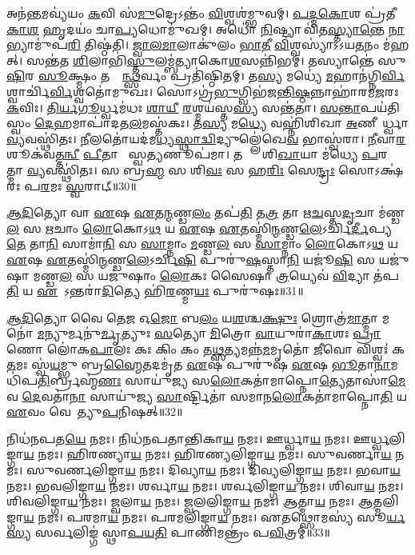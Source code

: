 𑌅𑌨॑\ul{𑌨𑍍𑌤}𑌮𑌵𑍍𑌯॑𑌯𑌂 \ul{𑌕}𑌵𑌿 𑌸॑\ul{𑌮𑍁}𑌦𑍍𑌰𑍇𑌽𑌨𑍍𑌤𑌂॑ \ul{𑌵𑌿}𑌶𑍍𑌵𑌶॑𑌮𑍍𑌭𑍁𑌵𑌮𑍍। 
\ul{𑌪}\ul{𑌦𑍍𑌮}\ul{𑌕𑍋}𑌶 𑌪𑍍𑌰॑𑌤𑍀\ul{𑌕𑌾}\ul{𑌶}\ul{} \ul{𑌹𑍃}𑌦𑌯𑌂॑ 𑌚𑌾\ul{𑌪𑍍𑌯}𑌧𑍋𑌮𑍁॑𑌖𑌮𑍍। 
𑌅𑌧𑍋॑ \ul{𑌨𑌿}𑌷𑍍𑌟𑍍𑌯𑌾 𑌵𑌿॑𑌤\ul{𑌸𑍍𑌤𑍍𑌯𑌾}\ul{𑌨𑍍𑌤𑍇} \ul{𑌨𑌾}𑌭𑍍𑌯𑌾𑌮𑍁॑𑌪\ul{𑌰𑌿} 𑌤𑌿𑌷𑍍𑌠॑𑌤𑌿। 
\ul{𑌜𑍍𑌵𑌾}\ul{𑌲}\ul{𑌮𑌾}𑌲𑌾𑌕𑍁॑𑌲𑌂 \ul{𑌭𑌾}\ul{𑌤𑍀} \ul{𑌵𑌿}𑌶𑍍𑌵𑌸𑍍𑌯𑌾॑𑌽𑌽𑌯\ul{𑌤}𑌨𑌂 𑌮॑𑌹𑌤𑍍। 
𑌸𑌨𑍍𑌤॑𑌤 \ul{𑌶𑌿}𑌲𑌾𑌭𑌿॑\ul{𑌸𑍍𑌤𑍁}\-𑌲𑌮𑍍𑌬॑𑌤𑍍𑌯𑌾𑌕𑍋\ul{𑌶}𑌸𑌨𑍍𑌨𑌿॑𑌭𑌮𑍍। 
𑌤𑌸𑍍𑌯𑌾𑌨𑍍𑌤𑍇॑ 𑌸𑍁\ul{𑌷𑌿}𑌰 \ul{𑌸𑍂}𑌕𑍍𑌷𑍍𑌮𑌂 𑌤𑌸𑍍𑌮𑌿᳚\ul{𑌨𑍍𑌥𑍍𑌸}𑌰𑍍𑌵𑌂 𑌪𑍍𑌰𑌤𑌿॑𑌷𑍍𑌠𑌿𑌤𑌮𑍍। 
𑌤\ul{𑌸𑍍𑌯} 𑌮𑌧𑍍𑌯𑍇॑ \ul{𑌮}𑌹𑌾𑌨॑\-𑌗𑍍𑌨𑌿\ul{𑌰𑍍𑌵𑌿}𑌶𑍍𑌵𑌾𑌰𑍍𑌚𑌿॑\ul{𑌰𑍍𑌵𑌿}𑌶𑍍𑌵𑌤𑍋॑𑌮𑍁𑌖𑌃। 
𑌸𑍋𑌽𑌗𑍍𑌰॑\ul{𑌭𑍁}𑌗𑍍𑌵𑌿𑌭॑𑌜\ul{𑌨𑍍𑌤𑌿}\ul{𑌷𑍍𑌠}𑌨𑍍𑌨𑌾𑌹𑌾॑𑌰𑌮\ul{𑌜}𑌰𑌃 \ul{𑌕}𑌵𑌿𑌃। 
\ul{𑌤𑌿}\ul{𑌰𑍍𑌯}\ul{𑌗𑍂}𑌰𑍍𑌧𑍍𑌵𑌮॑𑌧𑌃 \ul{𑌶𑌾}\ul{𑌯𑍀} \ul{𑌰}𑌶𑍍𑌮𑌯॑𑌸𑍍𑌤\ul{𑌸𑍍𑌯} 𑌸𑌨𑍍𑌤॑𑌤𑌾। 
\ul{𑌸}\ul{𑌨𑍍𑌤𑌾}𑌪𑌯॑𑌤𑌿 𑌸𑍍𑌵𑌂 \ul{𑌦𑍇}𑌹𑌮𑌾𑌪𑌾॑𑌦\-𑌤\ul{𑌲}\-𑌮𑌸𑍍𑌤॑𑌕𑌃। 
𑌤\ul{𑌸𑍍𑌯} 𑌮\ul{𑌧𑍍𑌯𑍇} 𑌵𑌹𑍍𑌨𑌿॑𑌶𑌿𑌖𑌾 \ul{𑌅}𑌣𑍀𑌯𑍋᳚𑌰𑍍𑌧𑍍𑌵𑌾 \ul{𑌵𑍍𑌯}𑌵𑌸𑍍𑌥𑌿॑𑌤𑌃। 
\ul{𑌨𑍀}𑌲𑌤𑍋॑𑌯𑌦॑\-𑌮\ul{𑌧𑍍𑌯}\ul{𑌸𑍍𑌥𑌾}\ul{𑌦𑍍𑌵𑌿}𑌦𑍍𑌯𑍁𑌲𑍍𑌲𑍇॑𑌖𑍇\ul{𑌵} 𑌭𑌾𑌸𑍍𑌵॑𑌰𑌾। 
\ul{𑌨𑍀}𑌵𑌾\ul{𑌰}𑌶𑍂𑌕॑𑌵\ul{𑌤𑍍𑌤}\ul{𑌨𑍍𑌵𑍀} \ul{𑌪𑍀}𑌤𑌾 𑌭𑌾᳚𑌸𑍍𑌵\ul{𑌤𑍍𑌯}𑌣𑍂𑌪॑𑌮𑌾। 
𑌤𑌸𑍍𑌯𑌾𑌃᳚ 𑌶𑌿\ul{𑌖𑌾}𑌯𑌾 𑌮॑𑌧𑍍𑌯𑍇 \ul{𑌪}𑌰𑌮𑌾᳚𑌤𑍍𑌮𑌾 \ul{𑌵𑍍𑌯}𑌵𑌸𑍍𑌥𑌿॑𑌤𑌃। 
𑌸 𑌬𑍍𑌰\ul{𑌹𑍍𑌮} 𑌸 𑌶𑌿\ul{𑌵𑌃} 𑌸 𑌹\ul{𑌰𑌿𑌃} 𑌸𑍇\ul{𑌨𑍍𑌦𑍍𑌰𑌃} 𑌸𑍋𑌽𑌕𑍍𑌷॑𑌰𑌃 𑌪\ul{𑌰}𑌮𑌃 \ul{𑌸𑍍𑌵}𑌰𑌾𑌟𑍍॥30॥
\anuvakamend[\ul{𑌨𑌾}\ul{𑌰𑌾}\ul{𑌯}𑌣𑌃 𑌸𑍍𑌥𑌿॑𑌤𑍋 \ul{𑌵𑍍𑌯}𑌵𑌸𑍍𑌥𑌿॑𑌤\ul{𑌶𑍍𑌚}𑌤𑍍𑌵𑌾𑌰𑌿॑ 𑌚]

\ul{𑌆}\ul{𑌦𑌿}𑌤𑍍𑌯𑍋 𑌵𑌾 \ul{𑌏}𑌷 \ul{𑌏}𑌤\ul{𑌨𑍍𑌮}𑌣𑍍𑌡\ul{𑌲𑌂} 𑌤𑌪॑\ul{𑌤𑌿} 𑌤\ul{𑌤𑍍𑌰} 𑌤𑌾 𑌋\ul{𑌚}𑌸𑍍𑌤\ul{𑌦𑍃}𑌚𑌾 𑌮॑𑌣𑍍𑌡\ul{𑌲}\ul{} 𑌸 \ul{𑌋}𑌚𑌾𑌂 \ul{𑌲𑍋}𑌕𑍋𑌽\ul{𑌥} 𑌯 \ul{𑌏}𑌷 \ul{𑌏}𑌤𑌸𑍍𑌮𑌿॑\ul{𑌨𑍍𑌮}𑌣𑍍𑌡\ul{𑌲𑍇}𑌽𑌰𑍍𑌚𑌿\ul{𑌰𑍍𑌦𑍀}𑌪𑍍𑌯\ul{𑌤𑍇} 𑌤𑌾\ul{𑌨𑌿} 𑌸𑌾𑌮𑌾॑\ul{𑌨𑌿} 𑌸 \ul{𑌸𑌾}𑌮𑍍𑌨𑌾𑌂 \ul{𑌮}𑌣𑍍𑌡\ul{𑌲}\ul{} 𑌸 \ul{𑌸𑌾}𑌮𑍍𑌨𑌾𑌂 \ul{𑌲𑍋}𑌕𑍋𑌽\ul{𑌥} 𑌯 \ul{𑌏}𑌷 \ul{𑌏}𑌤𑌸𑍍𑌮𑌿॑\ul{𑌨𑍍𑌮}𑌣𑍍𑌡\ul{𑌲𑍇}𑌽𑌰𑍍𑌚𑌿\ul{𑌷𑌿} 𑌪𑍁𑌰𑍁॑\ul{𑌷}𑌸𑍍𑌤𑌾\ul{𑌨𑌿} 𑌯𑌜𑍂॑\ul{𑌷𑌿} 𑌸 𑌯𑌜𑍁॑𑌷𑌾 𑌮𑌣𑍍𑌡\ul{𑌲}\ul{} 𑌸 𑌯𑌜𑍁॑𑌷𑌾𑌂 \ul{𑌲𑍋}𑌕𑌃 𑌸𑍈𑌷𑌾 \ul{𑌤𑍍𑌰}𑌯𑍍𑌯𑍇𑌵॑ \ul{𑌵𑌿}𑌦𑍍𑌯𑌾 𑌤॑𑌪\ul{𑌤𑌿} 𑌯 \ul{𑌏}𑌷𑍋᳚𑌽𑌨𑍍𑌤𑌰𑌾॑\ul{𑌦𑌿}𑌤𑍍𑌯𑍇 𑌹𑌿॑\ul{𑌰}𑌣𑍍𑌮\ul{𑌯𑌃} 𑌪𑍁𑌰𑍁॑𑌷𑌃॥31॥
\anuvakamend


\ul{𑌆}\ul{𑌦𑌿}𑌤𑍍𑌯𑍋 𑌵𑍈 𑌤𑍇\ul{𑌜} 𑌓\ul{𑌜𑍋} 𑌬\ul{𑌲𑌂} 𑌯\ul{𑌶}𑌶𑍍𑌚\ul{𑌕𑍍𑌷𑍁𑌃} 𑌶𑍍𑌰𑍋𑌤𑍍𑌰॑\ul{𑌮𑌾}𑌤𑍍𑌮𑌾 𑌮𑌨𑍋॑ \ul{𑌮}𑌨𑍍𑌯𑍁𑌰𑍍𑌮𑌨𑍁॑\ul{𑌰𑍍𑌮𑍃}𑌤𑍍𑌯𑍁𑌃 \ul{𑌸}𑌤𑍍𑌯𑍋 \ul{𑌮𑌿}𑌤𑍍𑌰𑍋 \ul{𑌵𑌾}𑌯𑍁𑌰𑌾॑\ul{𑌕𑌾}𑌶𑌃 \ul{𑌪𑍍𑌰𑌾}𑌣𑍋 𑌲𑍋॑𑌕\ul{𑌪𑌾}𑌲𑌃 𑌕𑌃 𑌕𑌿𑌂 𑌕𑌂 𑌤\ul{𑌥𑍍𑌸}𑌤𑍍𑌯𑌮𑌨𑍍𑌨॑\ul{𑌮}𑌮𑍃𑌤𑍋॑ \ul{𑌜𑍀}𑌵𑍋 𑌵𑌿𑌶𑍍𑌵𑌃॑ 𑌕\ul{𑌤}𑌮𑌃 𑌸𑍍𑌵॑\ul{𑌯}𑌮𑍍𑌭𑍁 𑌬𑍍𑌰\ul{𑌹𑍍𑌮𑍈}𑌤𑌦𑌮𑍃॑𑌤 \ul{𑌏}𑌷 𑌪𑍁𑌰𑍁॑𑌷 \ul{𑌏}𑌷 \ul{𑌭𑍂}𑌤𑌾\ul{𑌨𑌾}𑌮𑌧𑌿॑𑌪\ul{𑌤𑌿}𑌰𑍍𑌬𑍍𑌰𑌹𑍍𑌮॑\ul{𑌣𑌃} 𑌸𑌾𑌯𑍁॑𑌜𑍍𑌯 𑌸\ul{𑌲𑍋}𑌕𑌤𑌾॑𑌮𑌾𑌪𑍍𑌨𑍋\ul{𑌤𑍍𑌯𑍇}𑌤𑌾𑌸𑌾॑\ul{𑌮𑍇}𑌵 \ul{𑌦𑍇}𑌵𑌤𑌾॑\ul{𑌨𑌾}\ul{} 𑌸𑌾𑌯𑍁॑𑌜𑍍𑌯 \ul{𑌸𑌾}𑌰𑍍𑌷𑍍𑌟𑌿𑌤𑌾॑ 𑌸𑌮𑌾𑌨\ul{𑌲𑍋}𑌕𑌤𑌾॑𑌮𑌾𑌪𑍍𑌨𑍋\ul{𑌤𑌿} 𑌯 \ul{𑌏}𑌵𑌂 𑌵𑍇𑌦𑍇᳚𑌤𑍍𑌯𑍁\ul{𑌪}𑌨𑌿𑌷𑌤𑍍॥32॥
\anuvakamend

𑌨𑌿𑌧॑𑌨𑌪𑌤\ul{𑌯𑍇} 𑌨𑌮𑌃। 
𑌨𑌿𑌧॑𑌨𑌪𑌤𑌾𑌨𑍍𑌤𑌿𑌕𑌾\ul{𑌯} 𑌨𑌮𑌃। 
𑌊𑌰𑍍𑌧𑍍𑌵𑌾\ul{𑌯} 𑌨𑌮𑌃। 
𑌊𑌰𑍍𑌧𑍍𑌵𑌲𑌿𑌙𑍍𑌗𑌾\ul{𑌯} 𑌨𑌮𑌃। 
𑌹𑌿𑌰𑌣𑍍𑌯𑌾\ul{𑌯} 𑌨𑌮𑌃। 
𑌹𑌿𑌰𑌣𑍍𑌯𑌲𑌿𑌙𑍍𑌗𑌾\ul{𑌯} 𑌨𑌮𑌃। 
𑌸𑍁𑌵𑌰𑍍𑌣𑌾\ul{𑌯} 𑌨𑌮𑌃। 
𑌸𑍁𑌵𑌰𑍍𑌣𑌲𑌿𑌙𑍍𑌗𑌾\ul{𑌯} 𑌨𑌮𑌃। 
𑌦𑌿𑌵𑍍𑌯𑌾\ul{𑌯} 𑌨𑌮𑌃। 
𑌦𑌿𑌵𑍍𑌯𑌲𑌿𑌙𑍍𑌗𑌾\ul{𑌯} 𑌨𑌮𑌃। 
𑌭𑌵𑌾\ul{𑌯} 𑌨𑌮𑌃। 
𑌭𑌵𑌲𑌿𑌙𑍍𑌗𑌾\ul{𑌯} 𑌨𑌮𑌃। 
𑌶𑌰𑍍𑌵𑌾\ul{𑌯} 𑌨𑌮𑌃। 
𑌶𑌰𑍍𑌵𑌲𑌿𑌙𑍍𑌗𑌾\ul{𑌯} 𑌨𑌮𑌃। 
𑌶𑌿𑌵𑌾\ul{𑌯} 𑌨𑌮𑌃। 
𑌶𑌿𑌵𑌲𑌿𑌙𑍍𑌗𑌾\ul{𑌯} 𑌨𑌮𑌃। 
𑌜𑍍𑌵𑌲𑌾\ul{𑌯} 𑌨𑌮𑌃। 
𑌜𑍍𑌵𑌲𑌲𑌿𑌙𑍍𑌗𑌾\ul{𑌯} 𑌨𑌮𑌃। 
𑌆𑌤𑍍𑌮𑌾\ul{𑌯} 𑌨𑌮𑌃। 
𑌆𑌤𑍍𑌮𑌲𑌿𑌙𑍍𑌗𑌾\ul{𑌯} 𑌨𑌮𑌃। 
𑌪𑌰𑌮𑌾\ul{𑌯} 𑌨𑌮𑌃। 
𑌪𑌰𑌮𑌲𑌿𑌙𑍍𑌗𑌾\ul{𑌯} 𑌨𑌮𑌃। 
𑌏𑌤𑌥𑍍𑌸𑍋𑌮𑌸𑍍𑌯॑ 𑌸𑍂\ul{𑌰𑍍𑌯}\ul{𑌸𑍍𑌯} 𑌸𑌰𑍍𑌵𑌲𑌿𑌙𑍍𑌗॑ 𑌸𑍍𑌥𑌾\ul{𑌪}\ul{𑌯}\ul{𑌤𑌿} 𑌪𑌾𑌣𑌿𑌮𑌨𑍍𑌤𑍍𑌰𑌂॑ 𑌪\ul{𑌵𑌿}𑌤𑍍𑌰𑌮𑍍॥33॥
\anuvakamend

